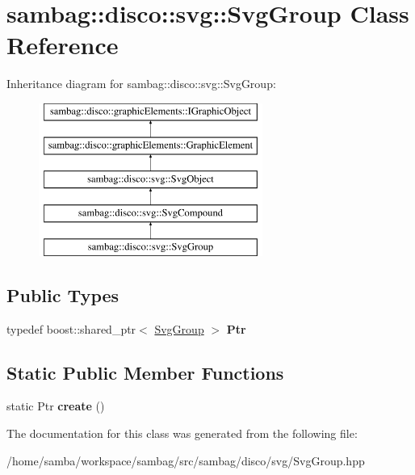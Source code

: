 \hypertarget{classsambag_1_1disco_1_1svg_1_1_svg_group}{
\section{sambag::disco::svg::SvgGroup Class Reference}
\label{classsambag_1_1disco_1_1svg_1_1_svg_group}
}
Inheritance diagram for sambag::disco::svg::SvgGroup:\begin{figure}[H]
\begin{center}
\leavevmode
\includegraphics[height=5.000000cm]{classsambag_1_1disco_1_1svg_1_1_svg_group}
\end{center}
\end{figure}
\subsection*{Public Types}
\begin{DoxyCompactItemize}
\item 
\hypertarget{classsambag_1_1disco_1_1svg_1_1_svg_group_a151838b5d1420428d57e8da808daf019}{
typedef boost::shared\_\-ptr$<$ \hyperlink{classsambag_1_1disco_1_1svg_1_1_svg_group}{SvgGroup} $>$ {\bfseries Ptr}}
\label{classsambag_1_1disco_1_1svg_1_1_svg_group_a151838b5d1420428d57e8da808daf019}

\end{DoxyCompactItemize}
\subsection*{Static Public Member Functions}
\begin{DoxyCompactItemize}
\item 
\hypertarget{classsambag_1_1disco_1_1svg_1_1_svg_group_af211e966e3ec192db5c46a30a1b6de97}{
static Ptr {\bfseries create} ()}
\label{classsambag_1_1disco_1_1svg_1_1_svg_group_af211e966e3ec192db5c46a30a1b6de97}

\end{DoxyCompactItemize}


The documentation for this class was generated from the following file:\begin{DoxyCompactItemize}
\item 
/home/samba/workspace/sambag/src/sambag/disco/svg/SvgGroup.hpp\end{DoxyCompactItemize}

